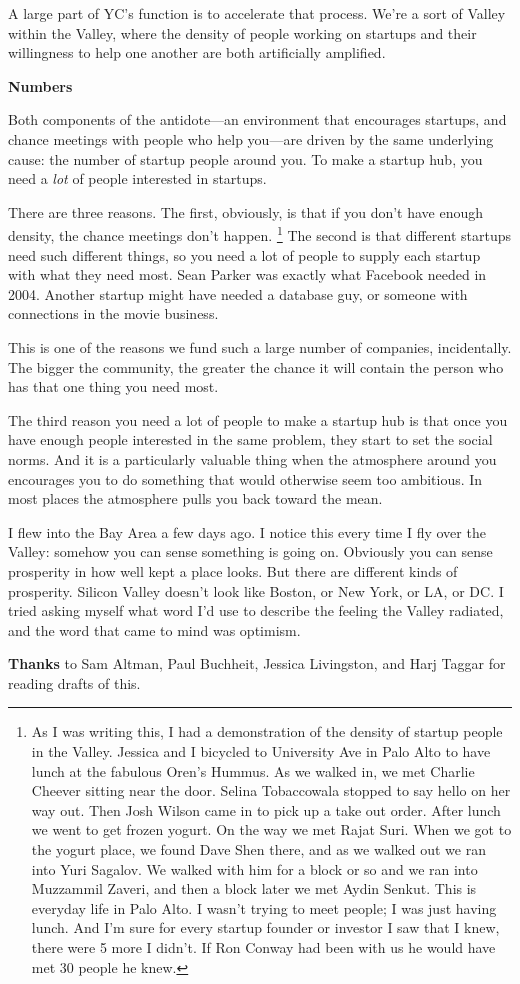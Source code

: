 A large part of YC's function is to accelerate that process. We're a
sort of Valley within the Valley, where the density of people working on
startups and their willingness to help one another are both artificially
amplified.

\textbf{Numbers}

Both components of the antidote---an environment that encourages
startups, and chance meetings with people who help you---are driven by
the same underlying cause: the number of startup people around you. To
make a startup hub, you need a \emph{lot} of people interested in
startups.

There are three reasons. The first, obviously, is that if you don't have
enough density, the chance meetings don't happen.
\footnote{As I was writing this, I had a demonstration of the density of
startup people in the Valley. Jessica and I bicycled to University Ave
in Palo Alto to have lunch at the fabulous Oren's Hummus. As we walked
in, we met Charlie Cheever sitting near the door. Selina Tobaccowala
stopped to say hello on her way out. Then Josh Wilson came in to pick up
a take out order. After lunch we went to get frozen yogurt. On the way
we met Rajat Suri. When we got to the yogurt place, we found Dave Shen
there, and as we walked out we ran into Yuri Sagalov. We walked with him
for a block or so and we ran into Muzzammil Zaveri, and then a block
later we met Aydin Senkut. This is everyday life in Palo Alto. I wasn't
trying to meet people; I was just having lunch. And I'm sure for every
startup founder or investor I saw that I knew, there were 5 more I
didn't. If Ron Conway had been with us he would have met 30 people he
knew.} The second is that different startups need such
different things, so you need a lot of people to supply each startup
with what they need most. Sean Parker was exactly what Facebook needed
in 2004. Another startup might have needed a database guy, or someone
with connections in the movie business.

This is one of the reasons we fund such a large number of companies,
incidentally. The bigger the community, the greater the chance it will
contain the person who has that one thing you need most.

The third reason you need a lot of people to make a startup hub is that
once you have enough people interested in the same problem, they start
to set the social norms. And it is a particularly valuable thing when
the atmosphere around you encourages you to do something that would
otherwise seem too ambitious. In most places the atmosphere pulls you
back toward the mean.

I flew into the Bay Area a few days ago. I notice this every time I fly
over the Valley: somehow you can sense something is going on. Obviously
you can sense prosperity in how well kept a place looks. But there are
different kinds of prosperity. Silicon Valley doesn't look like Boston,
or New York, or LA, or DC. I tried asking myself what word I'd use to
describe the feeling the Valley radiated, and the word that came to mind
was optimism.


\textbf{Thanks} to Sam Altman, Paul Buchheit, Jessica Livingston, and
Harj Taggar for reading drafts of this.